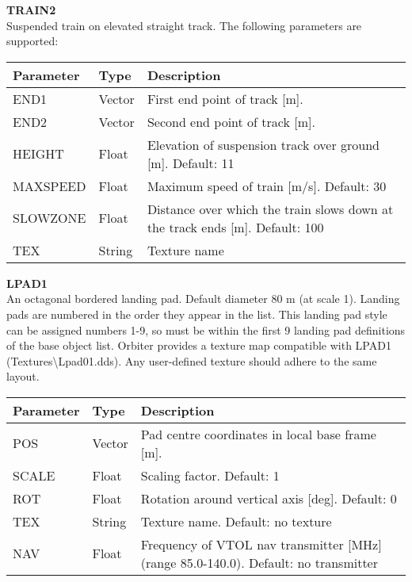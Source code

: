 \documentclass[Orbiter Developer Manual.tex]{subfiles}
\begin{document}
\noindent
\textbf{TRAIN2}\\
Suspended train on elevated straight track. The following parameters are supported:

	\begin{longtable}{ |p{}|p{}|p{}| }
	\hline\rule{0pt}{2ex}
	\textbf{Parameter} & \textbf{Type} & \textbf{Description}\\
	\hline\rule{0pt}{2ex}
	END1 & Vector & First end point of track [m].\\
	\hline\rule{0pt}{2ex}
	END2 & Vector & Second end point of track [m].\\
	\hline\rule{0pt}{2ex}
	HEIGHT & Float & Elevation of suspension track over ground [m]. Default: 11\\
	\hline\rule{0pt}{2ex}
	MAXSPEED & Float & Maximum speed of train [m/s]. Default: 30\\
	\hline\rule{0pt}{2ex}
	SLOWZONE & Float & Distance over which the train slows down at the track ends [m]. Default: 100\\
	\hline\rule{0pt}{2ex}
	TEX & String & Texture name\\
	\hline
	\end{longtable}

\noindent
\textbf{LPAD1}\\
An octagonal bordered landing pad. Default diameter 80 m (at scale 1). Landing pads are numbered in the order they appear in the list. This landing pad style can be assigned numbers 1-9, so must be within the first 9 landing pad definitions of the base object list. Orbiter provides a texture map compatible with LPAD1 (Textures\textbackslash Lpad01.dds). Any user-defined texture should adhere to the same layout.

	\begin{longtable}{ |p{}|p{}|p{}| }
	\hline\rule{0pt}{2ex}
	\textbf{Parameter} & \textbf{Type} & \textbf{Description}\\
	\hline\rule{0pt}{2ex}
	POS & Vector & Pad centre coordinates in local base frame [m].\\
	\hline\rule{0pt}{2ex}
	SCALE & Float & Scaling factor. Default: 1\\
	\hline\rule{0pt}{2ex}
	ROT & Float & Rotation around vertical axis [deg]. Default: 0\\
	\hline\rule{0pt}{2ex}
	TEX & String & Texture name. Default: no texture\\
	\hline\rule{0pt}{2ex}
	NAV & Float & Frequency of VTOL nav transmitter [MHz] (range 85.0-140.0). Default: no transmitter\\
	\hline
	\end{longtable}
\end{document}
